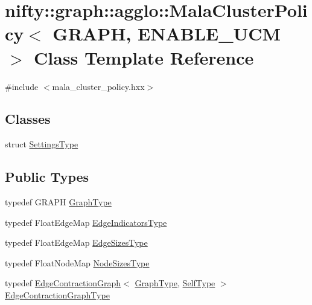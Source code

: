 \hypertarget{classnifty_1_1graph_1_1agglo_1_1MalaClusterPolicy}{}\section{nifty\+:\+:graph\+:\+:agglo\+:\+:Mala\+Cluster\+Policy$<$ G\+R\+A\+P\+H, E\+N\+A\+B\+L\+E\+\_\+\+U\+C\+M $>$ Class Template Reference}
\label{classnifty_1_1graph_1_1agglo_1_1MalaClusterPolicy}


{\ttfamily \#include $<$mala\+\_\+cluster\+\_\+policy.\+hxx$>$}

\subsection*{Classes}
\begin{DoxyCompactItemize}
\item 
struct \hyperlink{structnifty_1_1graph_1_1agglo_1_1MalaClusterPolicy_1_1SettingsType}{Settings\+Type}
\end{DoxyCompactItemize}
\subsection*{Public Types}
\begin{DoxyCompactItemize}
\item 
typedef G\+R\+A\+P\+H \hyperlink{classnifty_1_1graph_1_1agglo_1_1MalaClusterPolicy_ae2696b85f3f04787282e003bead20a5d}{Graph\+Type}
\item 
typedef Float\+Edge\+Map \hyperlink{classnifty_1_1graph_1_1agglo_1_1MalaClusterPolicy_acc2c04742b370c093267afd17a14bb0c}{Edge\+Indicators\+Type}
\item 
typedef Float\+Edge\+Map \hyperlink{classnifty_1_1graph_1_1agglo_1_1MalaClusterPolicy_a33924545e782bd520270341b21599e7e}{Edge\+Sizes\+Type}
\item 
typedef Float\+Node\+Map \hyperlink{classnifty_1_1graph_1_1agglo_1_1MalaClusterPolicy_a559774b548ec31fb481a848a12a45abe}{Node\+Sizes\+Type}
\item 
typedef \hyperlink{classnifty_1_1graph_1_1EdgeContractionGraph}{Edge\+Contraction\+Graph}$<$ \hyperlink{classnifty_1_1graph_1_1agglo_1_1MalaClusterPolicy_ae2696b85f3f04787282e003bead20a5d}{Graph\+Type}, \hyperlink{classnifty_1_1graph_1_1agglo_1_1MalaClusterPolicy}{Self\+Type} $>$ \hyperlink{classnifty_1_1graph_1_1agglo_1_1MalaClusterPolicy_a77a5b41304b53955aafbf214e2ad356f}{Edge\+Contraction\+Graph\+Type}
\end{DoxyCompactItemize}
